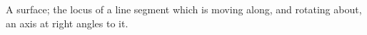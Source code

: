  A surface; the locus of a line segment which is moving along, and rotating
about, an axis at right angles to it.
